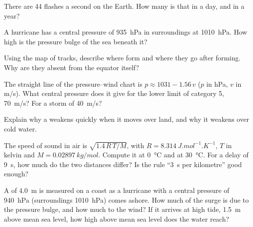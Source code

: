 \begin{exercise}[$\star\star$]\label{exo:g10:storms-and-cyclones:7}
There are 44  flashes a second on the Earth. How many is that in a
day, and in a year?
\end{exercise}

\begin{exercise}[$\star\star$]\label{exo:g10:storms-and-cyclones:8}
A hurricane has a central pressure of \qty{935}{hPa} in surroundings at
\qty{1010}{hPa}. How high is the pressure bulge of the sea beneath it?
\end{exercise}

\begin{exercise}[$\star\star$]\label{exo:g10:storms-and-cyclones:9}
Using the map of tracks, describe where  form and where
they go after forming. Why are they absent from the equator itself?
\end{exercise}

\begin{exercise}[$\star\star$]\label{exo:g10:storms-and-cyclones:10}
The straight line of the pressure--wind chart is $p \approx 1031 - 1.56\,v$
($p$ in \unit{hPa}, $v$ in \unit{m/s}). What central pressure does it give
for the lower limit of category 5, \qty{70}{m/s}? For a storm of
\qty{40}{m/s}?
\end{exercise}

\begin{exercise}[$\star\star$]\label{exo:g10:storms-and-cyclones:11}
Explain why a  weakens quickly when it moves over land, and
why it weakens over cold water.
\end{exercise}

\begin{exercise}[$\star\star\star$]\label{exo:g10:storms-and-cyclones:12}
The speed of sound in air is $\sqrt{1.4\,R\,T/M}$, with $R =
\qty{8.314}{J.mol^{-1}.K^{-1}}$, $T$ in kelvin and $M =
\qty{0.02897}{kg/mol}$. Compute it at \qty{0}{\degreeCelsius} and at
\qty{30}{\degreeCelsius}. For a delay of \qty{9}{s}, how much do the two
distances differ? Is the rule ``\qty{3}{s} per kilometre'' good enough?
\end{exercise}

\begin{exercise}[$\star\star\star$]\label{exo:g10:storms-and-cyclones:13}
A  of \qty{4.0}{m} is measured on a coast as a hurricane with a
central pressure of \qty{940}{hPa} (surroundings \qty{1010}{hPa}) comes
ashore. How much of the surge is due to the pressure bulge, and how much to
the wind? If it arrives at high tide, \qty{1.5}{m} above mean sea level, how
high above mean sea level does the water reach?
\end{exercise}

